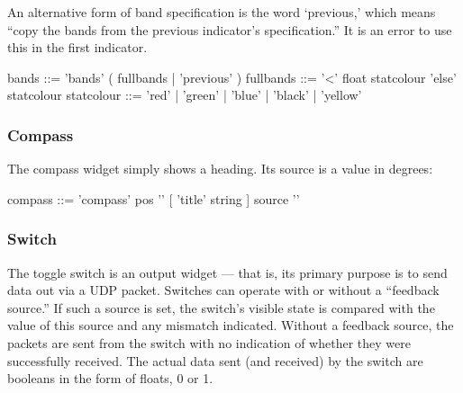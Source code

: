 An alternative form of band specification is the word `previous,'
which means ``copy the bands from the previous indicator's
specification.'' It is an error to use this in the first indicator.
\begin{v}
bands       ::= 'bands' ( fullbands | 'previous' )
fullbands   ::= { '<' float statcolour }
                'else' statcolour
statcolour  ::= 'red' | 'green' | 'blue' | 'black' | 'yellow'
\end{v}
               
\subsubsection{Compass}
The compass widget simply shows a heading. Its source is a value
in degrees:
\begin{v}
compass     ::= 'compass' pos '{'
                [ 'title' string ]
                source
                '}'
\end{v}


\subsubsection{Switch}
The toggle switch is an output widget --- that is, its primary purpose is to
send data out via a UDP packet. Switches can operate with or without a
``feedback source.'' If such a source is set, the switch's visible state is
compared with the value of this source and any mismatch indicated. Without a
feedback source, the packets are sent from the switch with no indication of
whether they were successfully received. The actual data sent (and received)
by the switch are booleans in the form of floats, 0 or 1.

